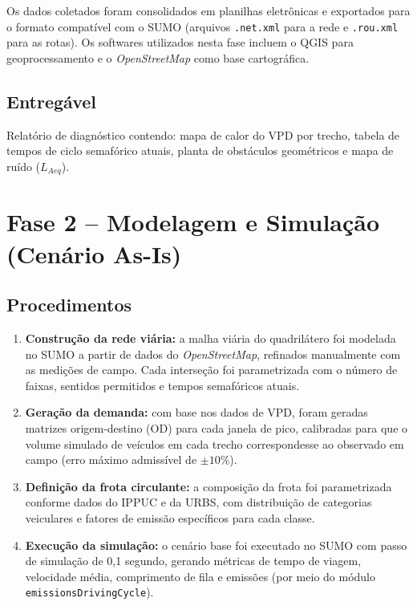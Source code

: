 \documentclass[12pt,a4paper,oneside]{abntex2}
\begin{document}
Os dados coletados foram consolidados em planilhas eletrônicas e exportados para o formato compatível com o SUMO (arquivos \texttt{.net.xml} para a rede e \texttt{.rou.xml} para as rotas). Os softwares utilizados nesta fase incluem o QGIS para geoprocessamento e o \textit{OpenStreetMap} como base cartográfica.

\subsection{Entregável}

Relatório de diagnóstico contendo: mapa de calor do VPD por trecho, tabela de tempos de ciclo semafórico atuais, planta de obstáculos geométricos e mapa de ruído ($L_{Aeq}$).

\section{Fase 2 -- Modelagem e Simulação (Cenário As-Is)}

\subsection{Procedimentos}

\begin{enumerate}[label=\textbf{P\arabic*:},leftmargin=2cm]
  \item \textbf{Construção da rede viária:} a malha viária do quadrilátero foi modelada no SUMO a partir de dados do \textit{OpenStreetMap}, refinados manualmente com as medições de campo. Cada interseção foi parametrizada com o número de faixas, sentidos permitidos e tempos semafóricos atuais.
  \item \textbf{Geração da demanda:} com base nos dados de VPD, foram geradas matrizes origem-destino (OD) para cada janela de pico, calibradas para que o volume simulado de veículos em cada trecho correspondesse ao observado em campo (erro máximo admissível de $\pm 10\%$).
  \item \textbf{Definição da frota circulante:} a composição da frota foi parametrizada conforme dados do IPPUC e da URBS, com distribuição de categorias veiculares e fatores de emissão específicos para cada classe.
  \item \textbf{Execução da simulação:} o cenário base foi executado no SUMO com passo de simulação de 0,1 segundo, gerando métricas de tempo de viagem, velocidade média, comprimento de fila e emissões (por meio do módulo \texttt{emissionsDrivingCycle}).
\end{enumerate}
\end{document}
